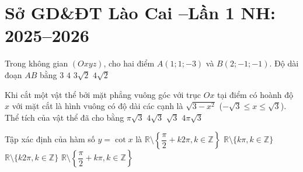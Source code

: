 \section{Sở GD\&ĐT  Lào Cai --Lần 1 NH: 2025--2026}
\caulc
\begin{ex}%
	Trong không gian $(Oxyz)$, cho hai điểm $A(1;1;-3)$ và $B(2;-1;-1)$. Độ dài đoạn $AB$ bằng
\choice
	{\True $3$}
	{$4$}
	{$3\sqrt{2}$}
	{$4\sqrt{2}$}
\end{ex}

\begin{ex}%
	Khi cắt một vật thể bởi mặt phẳng vuông góc với trục $Ox$ tại điểm có hoành độ $x$ với mặt cắt là hình vuông có độ dài các cạnh là $\sqrt{3-x^2}$ ($-\sqrt{3} \le x \le \sqrt{3}$). Thể tích của vật thể đã cho bằng
\choice
	{$\pi\sqrt{3}$}
	{\True $4\sqrt{3}$}
	{$\sqrt{3}$}
	{$4\pi\sqrt{3}$}
\end{ex}

\begin{ex}%
	Tập xác định của hàm số $y=\cot x$ là
\choice
	{$\mathbb{R}\setminus\left\{\dfrac{\pi}{2}+k2\pi,k\in\mathbb{Z}\right\}$}
	{\True $\mathbb{R}\setminus\{k\pi,k\in\mathbb{Z}\}$}
	{$\mathbb{R}\setminus\{k2\pi,k\in\mathbb{Z}\}$}
	{$\mathbb{R}\setminus\left\{\dfrac{\pi}{2}+k\pi,k\in\mathbb{Z}\right\}$}
\end{ex}

